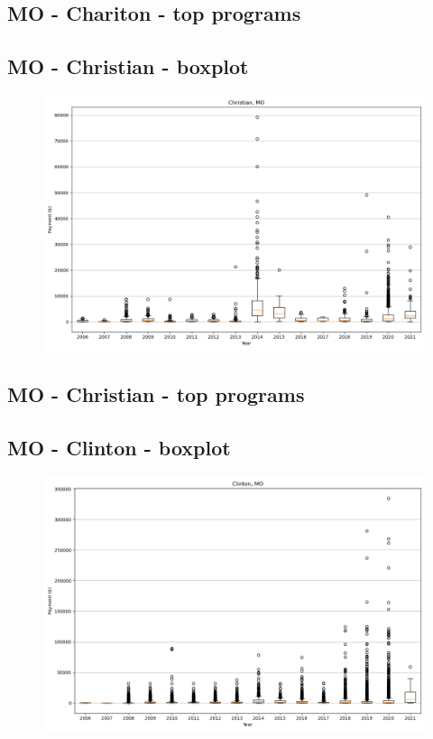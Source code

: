 \subsection*{MO - Chariton - top programs}

\newpage
\subsection*{MO - Christian - boxplot}
\begin{figure}[h]
\centering
\includegraphics[width=7in]{../output/boxplots/counties/Christian-MO_boxplot.png}
\end{figure}


\subsection*{MO - Christian - top programs}

\newpage
\subsection*{MO - Clinton - boxplot}
\begin{figure}[h]
\centering
\includegraphics[width=7in]{../output/boxplots/counties/Clinton-MO_boxplot.png}
\end{figure}


